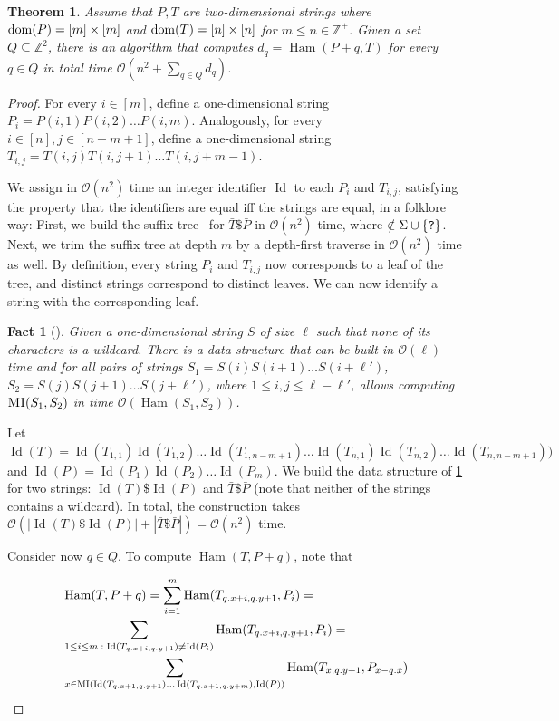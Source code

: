 \documentclass[11pt, letterpaper]{article}
\theoremstyle{plain}
\newtheorem{theorem}{Theorem}
\newtheorem{fact}{Fact}
\theoremstyle{definition}
\theoremstyle{remark}
\newcommand{\Z}{\mathbb{Z}}
\renewcommand{\O}{\mathcal{O}}
\DeclareMathOperator*{\Ham}{Ham}
\DeclareMathOperator*{\ID}{Id}
\newcommand{\absolute}[1]{\left\lvert#1\right\rvert}
\begin{document}
\begin{theorem}\label{kangaroos}
Assume that $P, T$ are two-dimensional strings where $\operatorname*{dom}(P) = [m] \times [m]$ and $\operatorname*{dom}(T) = [n] \times [n]$ for $m \le n \in \Z^+$. Given a set $Q \subseteq \Z^2$, there is an algorithm that computes $d_q = \Ham(P + q, T) $ for every $q \in Q$ in total time $\O(n^2 + \sum_{q \in Q} d_q)$.
\end{theorem}
\begin{proof}
For every $i \in [m]$, define a one-dimensional string $P_i = P(i,1) P(i,2) \ldots P(i,m)$. Analogously, for every $i \in [n], j \in [n-m+1]$, define a one-dimensional string $T_{i,j} = T(i,j) T(i,j+1) \ldots T(i,j+m-1)$. 

We assign in $\O(n^2)$ time an integer identifier $\ID$ to each $P_i$ and $T_{i,j}$, satisfying the property that the identifiers are equal iff the strings are equal, in a folklore way: First, we build the suffix tree~\cite{DBLP:conf/focs/Weiner73} for $\bar{T} \$ \bar{P}$ in $\O(n^2)$ time, where $ \notin \Sigma \cup \{\texttt{?}\}$. Next, we trim the suffix tree at depth $m$ by a depth-first traverse in $\O(n^2)$ time as well. By definition, every string $P_i$ and $T_{i,j}$ now corresponds to a leaf of the tree, and distinct strings correspond to distinct leaves. We can now identify a string with the corresponding leaf. 

\begin{fact}[{\cite{Galil1986}}]\label{fact:kangaroo1D}
Given a one-dimensional string $S$ of size $\ell$ such that none of its characters is a wildcard. There is a data structure that can be built in $\O(\ell)$ time and for all pairs of strings $S_1 = S(i) S(i+1) \ldots S(i+\ell')$, $S_2 = S(j) S(j+1) \ldots S(j+\ell')$, where $1 \le i,j \le \ell-\ell'$, allows computing $\textsc{MI}(S_1, S_2)$ in time $\O(\Ham(S_1,S_2))$. 
\end{fact}

Let $\ID(T) = \ID(T_{1,1}) \ID(T_{1,2}) \ldots \ID(T_{1,n-m+1}) \ldots \ID(T_{n,1}) \ID(T_{n,2}) \ldots \ID(T_{n,n-m+1}))$ and $\ID(P) = \ID(P_1)\ID(P_2) \ldots \ID(P_m)$. 
We build the data structure of \cref{fact:kangaroo1D} for two strings: $\ID(T) \$ \ID(P)$ and $\bar{T} \$ \bar{P}$ (note that neither of the strings contains a wildcard). In total, the construction takes $\O(\absolute{\ID(T) \$ \ID(P)} + \absolute{\bar{T} \$ \bar{P}}) = \O(n^2)$ time.

Consider now $q \in Q$. To compute $\Ham(T, P+q)$, note that 

\begin{align*}
&\Ham(T, P+q) = \sum_{i=1}^m \Ham(T_{\x{q}+i, \y{q}+1}, P_i)=\\
&\sum_{1 \le i \le m \; : \; \ID(T_{\x{q}+i, \y{q}+1}) \neq \ID(P_i)} \Ham(T_{\x{q}+i, \y{q}+1}, P_i) = \\
&\sum_{x \in \MI(\ID(T_{\x{q}+1, \y{q}+1}) \ldots \ID(T_{\x{q}+1, \y{q}+m}), \ID(P))} \Ham(T_{x, \y{q}+1}, P_{x-\x{q}})\\
\end{align*}


\end{proof}
\end{document}
